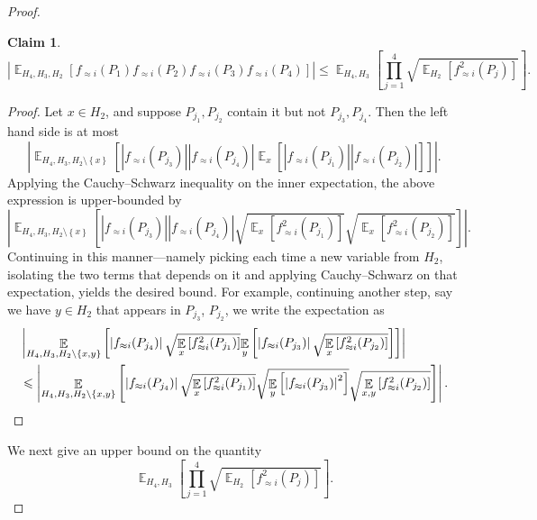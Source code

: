 \documentclass[11pt]{article}
\newtheorem{claim}[theorem]{Claim}
\newcommand\card[1]{\left| {#1} \right|}
\newcommand\set[1]{{\left\{ #1 \right\}}}
\newcommand\Expect[2]{{\mathop{\mathbb{E}}_{#1}\left[ {#2} \right]}}
\renewcommand\leq{\leqslant}
\newcommand\approxlvlfn[2]{{#1}_{\approx{#2}}}
\begin{document}
\begin{proof}
\begin{claim}
\[
\card{
\Expect{H_{4},H_{3},H_{2}}{
\approxlvlfn{f}{i}(P_1)\approxlvlfn{f}{i}(P_2)\approxlvlfn{f}{i}(P_3)\approxlvlfn{f}{i}(P_4)}
}
\leq
\Expect{H_{4},H_{3}}{
\prod\limits_{j=1}^{4}
\sqrt{\Expect{H_{2}}{\approxlvlfn{f}{i}^2(P_j)}}
%
%
%
%
}.
\]
\end{claim}
\begin{proof}
Let $x\in H_{2}$, and suppose $P_{j_1},P_{j_2}$ contain it but not $P_{j_3},P_{j_4}$. Then the left
hand side is at most
\[
\card{
\Expect{H_{4},H_{3},H_{2}\setminus\set{x}}{
\card{\approxlvlfn{f}{i}(P_{j_3})}
\card{\approxlvlfn{f}{i}(P_{j_4})}
\Expect{x}{\card{\approxlvlfn{f}{i}(P_{j_1})}\card{\approxlvlfn{f}{i}(P_{j_2})}}
}}.
\]
Applying the Cauchy--Schwarz inequality on the inner expectation, the above expression is
upper-bounded by
\[
\card{
\Expect{H_{4},H_{3},H_{2}\setminus\set{x}}{
\card{\approxlvlfn{f}{i}(P_{j_3})}
\card{\approxlvlfn{f}{i}(P_{j_4})}
\sqrt{\Expect{x}{\approxlvlfn{f}{i}^2(P_{j_1})}}
\sqrt{\Expect{x}{\approxlvlfn{f}{i}^2(P_{j_2})}}}
}.
\]
Continuing in this manner---namely picking each time a new variable from $H_2$, isolating the two terms that depends
on it and applying Cauchy--Schwarz on that expectation, yields the desired bound. For example, continuing another step,
say we have $y\in H_2$ that appears in $P_{j_3}$, $P_{j_2}$, we write the expectation as
\begin{align*}
&\card{
\Expect{H_{4},H_{3},H_{2}\setminus\set{x,y}}{
\card{\approxlvlfn{f}{i}(P_{j_4})}
\sqrt{\Expect{x}{\approxlvlfn{f}{i}^2(P_{j_1})}}
\Expect{y}{\card{\approxlvlfn{f}{i}(P_{j_3})}
\sqrt{\Expect{x}{\approxlvlfn{f}{i}^2(P_{j_2})}}}
}}\\
&\leq
\card{
\Expect{H_{4},H_{3},H_{2}\setminus\set{x,y}}{
\card{\approxlvlfn{f}{i}(P_{j_4})}
\sqrt{\Expect{x}{\approxlvlfn{f}{i}^2(P_{j_1})}}
\sqrt{\Expect{y}{\card{\approxlvlfn{f}{i}(P_{j_3})}^2}}
\sqrt{\Expect{x,y}{\approxlvlfn{f}{i}^2(P_{j_2})}}
}}          \qedhere   %
.
\end{align*}
\end{proof}

We next give an upper bound on the quantity %
\begin{equation}\label{eq5}
\Expect{H_{4},H_{3}}{
\prod\limits_{j=1}^{4}
\sqrt{\Expect{H_{2}}{\approxlvlfn{f}{i}^2(P_j)}}}.
\end{equation}


\end{proof}
\end{document}
